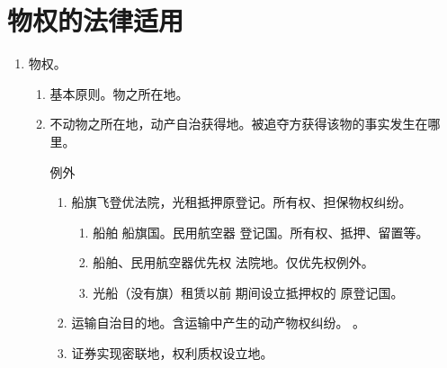 \section{物权的法律适用}
\begin{enumerate}
  \item 物权。
        \begin{enumerate}
          \item 基本原则。物之所在地。
          \item 不动物之所在地，动产自治获得地。被追夺方获得该物的事实发生在哪里。
                \begin{kk}{例外}
                  \begin{enumerate}
                    \item 船旗飞登优法院，光租抵押原登记。所有权、担保物权纠纷。
                          \begin{enumerate}
                            \item 船舶 \yjt 船旗国。民用航空器 \yjt 登记国。所有权、抵押、留置等。
                            \item 船舶、民用航空器优先权 \yjt 法院地。仅优先权例外。
                            \item 光船（没有旗）租赁以前 \hz 期间设立抵押权的 \yjt 原登记国。
                          \end{enumerate}
                    \item 运输自治目的地。含运输中产生的动产物权纠纷。
                          。
                    \item 证券实现密联地，权利质权设立地。
                  \end{enumerate}
                \end{kk}


\end{enumerate}
\end{enumerate}
